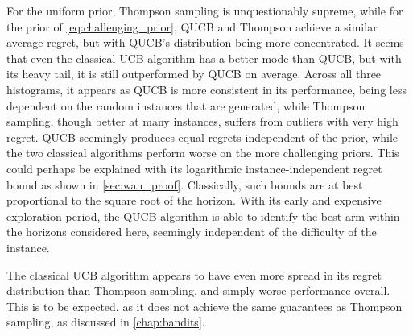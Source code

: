 For the uniform prior, Thompson sampling is unquestionably supreme, while for the prior of \cref{eq:challenging_prior}, QUCB and Thompson achieve a similar average regret, but with QUCB's distribution being more concentrated.
It seems that even the classical UCB algorithm has a better mode than QUCB, but with its heavy tail, it is still outperformed by QUCB on average.
Across all three histograms, it appears as QUCB is more consistent in its performance, being less dependent on the random instances that are generated, while Thompson sampling, though better at many instances, suffers from outliers with very high regret.
QUCB seemingly produces equal regrets independent of the prior, while the two classical algorithms perform worse on the more challenging priors.
This could perhaps be explained with its logarithmic instance-independent regret bound as shown in \cref{sec:wan_proof}.
Classically, such bounds are at best proportional to the square root of the horizon.
With its early and expensive exploration period, the QUCB algorithm is able to identify the best arm within the horizons considered here, seemingly independent of the difficulty of the instance.

The classical UCB algorithm appears to have even more spread in its regret distribution than Thompson sampling, and simply worse performance overall.
This is to be expected, as it does not achieve the same guarantees as Thompson sampling, as discussed in \cref{chap:bandits}.
\vspace{3.5cm}



